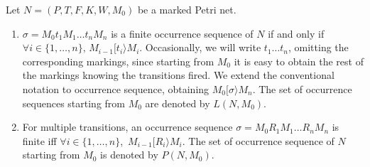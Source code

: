\begin{definition} 
Let $N=(P,T,F,K,W,M_0)$ be a marked Petri net.
\begin{enumerate}
\item $\sigma = M_0 t_1 M_1 \ldots t_n M_n$ is a finite occurrence sequence of $N$
if and only if $\forall i \in \{1,\ldots,n\},\,M_{i-1} [ t_i \rangle M_i$.
Occasionally, we will write $t_1 \ldots t_n$, omitting the corresponding markings, since starting from
$M_0$ it is easy to obtain the rest of the markings knowing the transitions fired.
We extend the conventional notation to occurrence sequence, 
obtaining $M_0 [ \sigma \rangle M_n$.
The set of occurrence sequences starting from $M_0$ are denoted by $L(N,M_0)$.

\item For multiple transitions, an occurrence sequence $\sigma = M_0 R_1 M_1 \ldots R_n M_n$ is finite
iff $\forall i \in \{1,\ldots,n\}$, $\,M_{i-1} [ R_i \rangle M_i$.
The set of occurrence sequence of $N$ starting from $M_0$ is denoted by $P(N,M_0)$.
\end{enumerate}
\end{definition}



%
%
%

